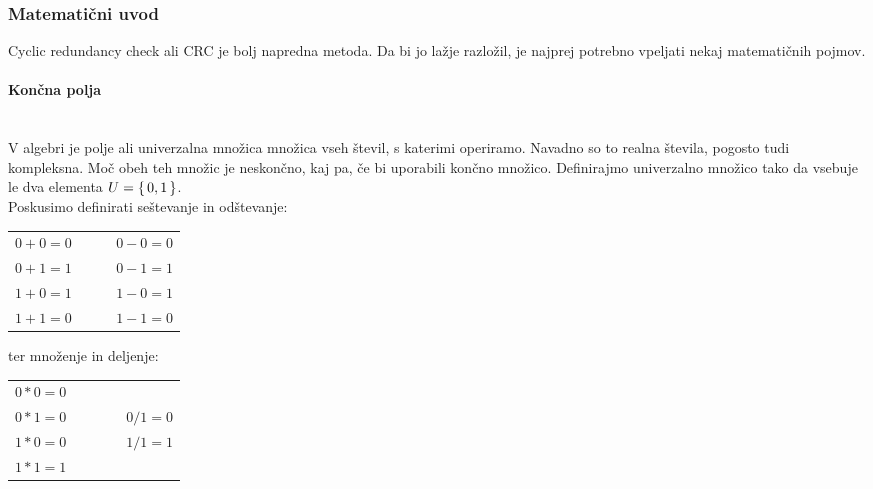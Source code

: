 \documentclass[12pt]{article}
\begin{document}
        \subsubsection{Matematični uvod}
            Cyclic redundancy check ali CRC je bolj napredna metoda. Da bi jo 
            lažje razložil, je najprej potrebno vpeljati nekaj matematičnih 
            pojmov.
            \paragraph{Končna polja} \label{sec:polja} \mbox{}\\
                V algebri je polje ali univerzalna množica množica vseh števil,
                s katerimi operiramo. Navadno so to realna števila, pogosto tudi
                kompleksna. Moč obeh teh množic je neskončno, kaj pa, če bi
                uporabili končno množico. Definirajmo univerzalno množico tako 
                da vsebuje le dva elementa $U = \set{0, 1}$.\\
                Poskusimo definirati seštevanje in odštevanje:
                \begin{table}[h!]
                    \centering
                    \begin{tabular}{l p{0.2\linewidth}}
                        $0 + 0 = 0$  & $0 - 0 = 0$ \\
                        $0 + 1 = 1$  & $0 - 1 = 1$ \\
                        $1 + 0 = 1$  & $1 - 0 = 1$ \\
                        $1 + 1 = 0$  & $1 - 1 = 0$ \\
                    \end{tabular}
                \end{table}

                ter množenje in deljenje:
                \begin{table}[h!]
                    \centering
                    \begin{tabular}{l p{0.2\linewidth}}
                        $0 * 0 = 0$  &  \\
                        $0 * 1 = 0$  & $0 / 1 = 0$\\
                        $1 * 0 = 0$  & $1 / 1 = 1$\\
                        $1 * 1 = 1$  &  \\
                    \end{tabular}
                \end{table}
\end{document}
